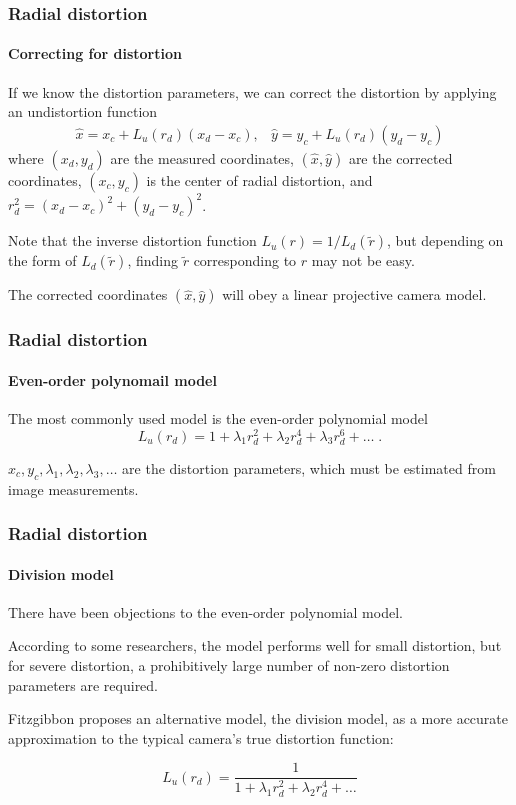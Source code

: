 \documentclass[aspectratio=169]{beamer}
\begin{document}
\begin{frame}
\frametitle{Radial distortion}
\framesubtitle{Correcting for distortion}

If we \alert{know the distortion parameters}, we can \alert{correct}
the distortion by applying an \alert{undistortion function}
\begin{equation*}
\begin{matrix}
\hat{x} = x_c + L_u(r_d) (x_d-x_c),
&
\hat{y} = y_c + L_u(r_d) (y_d-y_c)
\end{matrix}
\end{equation*}
where $(x_d,y_d)$ are the \alert{measured} coordinates,
$(\hat{x},\hat{y})$ are the \alert{corrected} coordinates,
$(x_c,y_c)$ is the \alert{center of radial distortion}, and $r_d^2 =
(x_d-x_c)^2+(y_d-y_c)^2$.

\medskip

Note that the inverse distortion function
$L_u(r) = 1/L_d(\tilde{r})$, but depending on the form of $L_d(\tilde{r})$,
finding $\tilde{r}$ corresponding to $r$ may not be easy.

\medskip

The corrected coordinates $(\hat{x},\hat{y})$ will obey a
\alert{linear} projective camera model.

\end{frame}


\begin{frame}
\frametitle{Radial distortion}
\framesubtitle{Even-order polynomail model}

The most commonly used model is the
\alert{even-order polynomial model}
\begin{equation*}
L_u(r_d) = 1+\lambda_1 r^2_d+\lambda_2 r^4_d+\lambda_3 r^6_d+\ldots \; .
\end{equation*}

$x_c, y_c, \lambda_1, \lambda_2, \lambda_3, \ldots$
are the \alert{distortion parameters}, which
must be estimated from image measurements.

\end{frame}


\begin{frame}
\frametitle{Radial distortion}
\framesubtitle{Division model}

There have been objections to the even-order polynomial model.

\medskip

According to some researchers, the model performs well for
small distortion, but for \alert{severe distortion}, a
\alert{prohibitively large
number of non-zero distortion parameters} are required.

\medskip

Fitzgibbon proposes an alternative model, the
\alert{division model}, as a more accurate approximation to the
typical camera's true distortion function:

\begin{equation*}
L_u(r_d) = \frac{1}{1+\lambda_1 r^2_d+\lambda_2 r^4_d+\ldots}
\end{equation*}

\end{frame}
\end{document}
